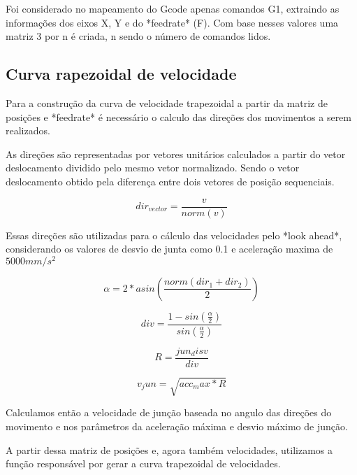 Foi considerado no mapeamento do Gcode apenas comandos G1, extraindo
as informações dos eixos X, Y e do *feedrate* (F). Com base nesses valores
uma matriz 3 por n é criada, n sendo o número de comandos lidos.

\subsection{Curva rapezoidal de velocidade}
Para a construção da curva de velocidade trapezoidal a partir da matriz de posições
e *feedrate* é necessário o calculo das direções dos movimentos a serem realizados.

As direções são representadas por vetores unitários calculados a partir
do vetor deslocamento dividido pelo mesmo vetor normalizado. Sendo o vetor deslocamento
obtido pela diferença entre dois vetores de posição sequenciais.

\begin{equation}
    \label{eq:dir_eq}
    dir_{vector} = \frac{v}{norm(v)}
\end{equation}

Essas direções são utilizadas para o cálculo das velocidades pelo *look ahead*,
considerando os valores de desvio de junta como  0.1 e aceleração maxima de $5000 mm/s^2$

\begin{equation}
    \label{eq:alpha}
    \alpha = 2*asin\left(\frac{norm(dir_1+dir_2)}{2}\right)
\end{equation}

\begin{equation}
    \label{eq:div}
    div = \frac{1-sin\left(\frac{\alpha}{2}\right)}{sin(\frac{\alpha}{2})}
\end{equation}

\begin{equation}
    \label{eq:R_jun}
    R = \frac{jun_disv}{div}
\end{equation}

\begin{equation}
    \label{eq:v_jun}
    v_jun = \sqrt{acc_max*R}
\end{equation}


Calculamos então a velocidade de junção baseada no angulo das direções do movimento e
nos parâmetros da aceleração máxima e desvio máximo de junção.

A partir dessa matriz de posições e, agora também velocidades,
utilizamos a função responsável por gerar a curva trapezoidal de velocidades.

